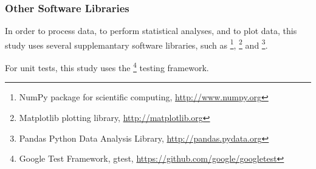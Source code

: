 

\subsubsection{Other Software Libraries}

In order to process data, to perform statistical analyses, and to plot data, this study uses several supplemantary software libraries, such as \footnote{NumPy package for scientific computing, \url{http://www.numpy.org}}, \footnote{Matplotlib plotting library, \url{http://matplotlib.org}} and \footnote{Pandas Python Data Analysis Library, \url{http://pandas.pydata.org}}.


For unit tests, this study uses the \footnote{Google Test Framework, gtest, \url{https://github.com/google/googletest}} testing framework.

